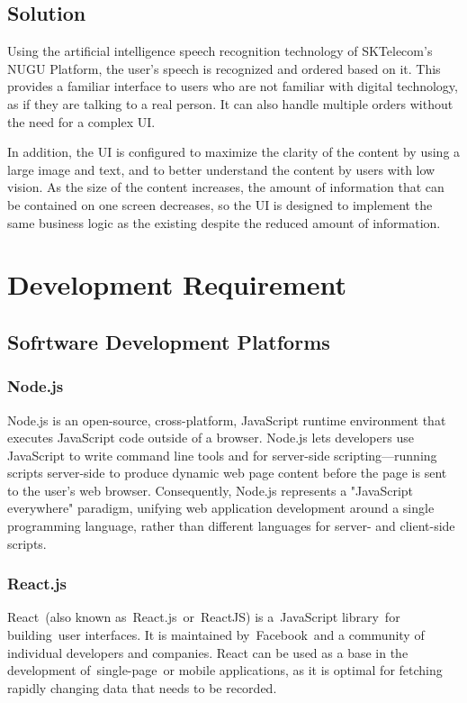 \documentclass[conference,compsoc]{IEEEtran}
\begin{document}
\subsection{Solution}
Using the artificial intelligence speech recognition technology of SKTelecom's NUGU Platform, the user's speech is recognized and ordered based on it. This provides a familiar interface to users who are not familiar with digital technology, as if they are talking to a real person. It can also handle multiple orders without the need for a complex UI.

In addition, the UI is configured to maximize the clarity of the content by using a large image and text, and to better understand the content by users with low vision. As the size of the content increases, the amount of information that can be contained on one screen decreases, so the UI is designed to implement the same business logic as the existing despite the reduced amount of information.

\section{Development Requirement}

\subsection{Sofrtware Development Platforms}

\subsubsection{Node.js}

Node.js is an open-source, cross-platform, JavaScript runtime environment that executes JavaScript code outside of a browser. Node.js lets developers use JavaScript to write command line tools and for server-side scripting—running scripts server-side to produce dynamic web page content before the page is sent to the user's web browser. Consequently, Node.js represents a "JavaScript everywhere" paradigm, unifying web application development around a single programming language, rather than different languages for server- and client-side scripts.

\subsubsection{React.js}

React (also known as React.js or ReactJS) is a JavaScript library for building user interfaces. It is maintained by Facebook and a community of individual developers and companies. React can be used as a base in the development of single-page or mobile applications, as it is optimal for fetching rapidly changing data that needs to be recorded.
\end{document}
